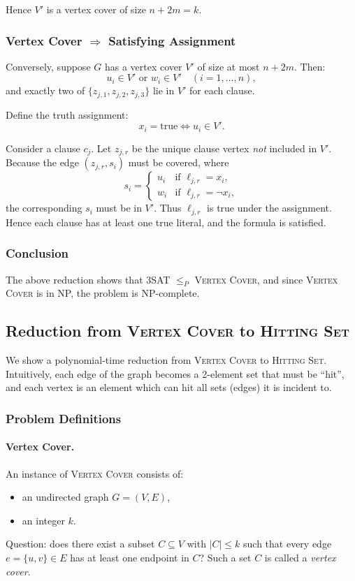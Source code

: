 \documentclass[9pt]{extarticle}
\begin{document}
Hence \(V'\) is a vertex cover of size \(n + 2m = k\).

\subsubsection*{Vertex Cover \(\Rightarrow\) Satisfying Assignment}

Conversely, suppose \(G\) has a vertex cover \(V'\) of size at most \(n + 2m\).
Then:
\[
u_i \in V' \text{ or } w_i \in V' \quad (i = 1,\dots,n),
\]
and exactly two of \(\{z_{j,1},z_{j,2},z_{j,3}\}\) lie in \(V'\) for each clause.

Define the truth assignment:
\[
x_i = \text{true} \iff u_i \in V'.
\]

Consider a clause \(c_j\).  
Let \(z_{j,r}\) be the unique clause vertex \emph{not} included in \(V'\).
Because the edge \((z_{j,r}, s_i)\) must be covered, where
\[
s_i = \begin{cases}
u_i & \text{if } \ell_{j,r} = x_i, \\
w_i & \text{if } \ell_{j,r} = \neg x_i,
\end{cases}
\]
the corresponding \(s_i\) must be in \(V'\).  
Thus \(\ell_{j,r}\) is true under the assignment.
Hence each clause has at least one true literal, and the formula is satisfied.

\subsubsection*{Conclusion}

The above reduction shows that 3SAT \(\le_P\) \textsc{Vertex Cover}, and since
\textsc{Vertex Cover} is in NP, the problem is NP-complete.

\subsection{Reduction from \textsc{Vertex Cover} to \textsc{Hitting Set}}

We show a polynomial-time reduction from \textsc{Vertex Cover} to
\textsc{Hitting Set}.  Intuitively, each edge of the graph becomes a
2-element set that must be ``hit'', and each vertex is an element which can
hit all sets (edges) it is incident to.

\subsubsection*{Problem Definitions}

\paragraph{Vertex Cover.}
An instance of \textsc{Vertex Cover} consists of:
\begin{itemize}
    \item an undirected graph $G = (V,E)$,
    \item an integer $k$.
\end{itemize}
Question: does there exist a subset $C \subseteq V$ with $|C| \le k$ such that
every edge $e = \{u,v\} \in E$ has at least one endpoint in $C$?  Such a set
$C$ is called a \emph{vertex cover}.
\end{document}
